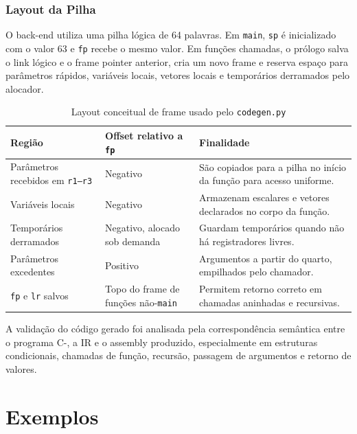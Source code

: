 \documentclass[
	12pt,				%
	oneside,
	a4paper,			%
	english,			%
	french,				%
	spanish,			%
	brazil,				%
	]{abntex2}
\begin{document}
\subsection{Layout da Pilha}
O back-end utiliza uma pilha lógica de 64 palavras. Em \texttt{main}, \texttt{sp} é inicializado com o valor 63 e \texttt{fp} recebe o mesmo valor. Em funções chamadas, o prólogo salva o link lógico e o frame pointer anterior, cria um novo frame e reserva espaço para parâmetros rápidos, variáveis locais, vetores locais e temporários derramados pelo alocador.

\begin{table}[H]
    \centering
    \ABNTEXfontereduzida
    \caption{Layout conceitual de frame usado pelo \texttt{codegen.py}}
    \label{tab:layout_pilha}
    \begin{tabular}{|p{}|p{}|p{}|}
        \hline
        \textbf{Região} & \textbf{Offset relativo a \texttt{fp}} & \textbf{Finalidade} \\
        \hline
        Parâmetros recebidos em \texttt{r1--r3} & Negativo & São copiados para a pilha no início da função para acesso uniforme. \\
        \hline
        Variáveis locais & Negativo & Armazenam escalares e vetores declarados no corpo da função. \\
        \hline
        Temporários derramados & Negativo, alocado sob demanda & Guardam temporários quando não há registradores livres. \\
        \hline
        Parâmetros excedentes & Positivo & Argumentos a partir do quarto, empilhados pelo chamador. \\
        \hline
        \texttt{fp} e \texttt{lr} salvos & Topo do frame de funções não-\texttt{main} & Permitem retorno correto em chamadas aninhadas e recursivas. \\
        \hline
    \end{tabular}
\end{table}

A validação do código gerado foi analisada pela correspondência semântica entre o programa C-, a IR e o assembly produzido, especialmente em estruturas condicionais, chamadas de função, recursão, passagem de argumentos e retorno de valores.

\chapter{Exemplos}
\label{cap:exemplos}
\end{document}
